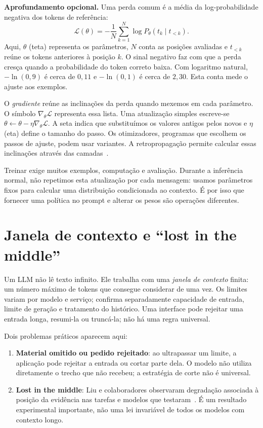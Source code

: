 \textbf{Aprofundamento opcional.} Uma perda comum é a média da log-probabilidade negativa dos tokens de referência:
\[
\mathcal{L}(\theta)=-\frac{1}{N}\sum_{k=1}^{N}
\log P_{\theta}(t_k\mid t_{<k}).
\]
Aqui, $\theta$ (teta) representa os parâmetros, $N$ conta as posições avaliadas e $t_{<k}$ reúne os tokens anteriores à posição $k$. O sinal negativo faz com que a perda cresça quando a probabilidade do token correto baixa. Com logaritmo natural, $-\ln(0{,}9)$ é cerca de $0{,}11$ e $-\ln(0{,}1)$ é cerca de $2{,}30$. Esta conta mede o ajuste aos exemplos.

O \emph{gradiente} reúne as inclinações da perda quando mexemos em cada parâmetro. O símbolo $\nabla_{\theta}\mathcal{L}$ representa essa lista. Uma atualização simples escreve-se $\theta\leftarrow\theta-\eta\nabla_{\theta}\mathcal{L}$. A seta indica que substituímos os valores antigos pelos novos e $\eta$ (eta) define o tamanho do passo. Os otimizadores, programas que escolhem os passos de ajuste, podem usar variantes. A retropropagação permite calcular essas inclinações através das camadas~\citep{goodfellow2016}.

Treinar exige muitos exemplos, computação e avaliação. Durante a inferência normal, não repetimos esta atualização por cada mensagem: usamos parâmetros fixos para calcular uma distribuição condicionada ao contexto. É por isso que fornecer uma política no prompt e alterar os pesos são operações diferentes.

\section{Janela de contexto e “lost in the middle”}

Um LLM não lê texto infinito. Ele trabalha com uma \emph{janela de contexto} finita: um número máximo de tokens que consegue considerar de uma vez. Os limites variam por modelo e serviço; confirma separadamente capacidade de entrada, limite de geração e tratamento do histórico. Uma interface pode rejeitar uma entrada longa, resumi-la ou truncá-la; não há uma regra universal.

Dois problemas práticos aparecem aqui:

\begin{enumerate}[leftmargin=*]
\item \textbf{Material omitido ou pedido rejeitado}: ao ultrapassar um limite, a aplicação pode rejeitar a entrada ou cortar parte dela. O modelo não utiliza diretamente o trecho que não recebeu; a estratégia de corte não é universal.
\item \textbf{Lost in the middle}: Liu e colaboradores observaram degradação associada à posição da evidência nas tarefas e modelos que testaram~\citep{liu2024}. É um resultado experimental importante, não uma lei invariável de todos os modelos com contexto longo.
\end{enumerate}

